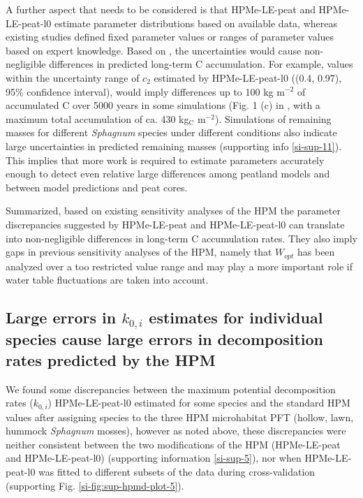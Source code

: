 \documentclass[esd, manuscript]{copernicus}
\begin{document}
A further aspect that needs to be considered is that HPMe-LE-peat and HPMe-LE-peat-l0 estimate parameter distributions based on available data, whereas existing studies defined fixed parameter values or ranges of parameter values based on expert knowledge. Based on \citet{Quillet.2013}, the uncertainties would cause non-negligible differences in predicted long-term C accumulation. For example, values within the uncertainty range of \(c_2\) estimated by HPMe-LE-peat-l0 ((0.4, 0.97), 95\% confidence interval), would imply differences up to 100 kg m\(^{-2}\) of accumulated C over 5000 years in some simulations (Fig. 1 (c) in \citet{Quillet.2013}, with a maximum total accumulation of ca. 430 kg\(_\text{C}\) m\(^{-2}\)). Simulations of remaining masses for different \emph{Sphagnum} species under different conditions also indicate large uncertainties in predicted remaining masses (supporting info \ref{si-sup-11}). This implies that more work is required to estimate parameters accurately enough to detect even relative large differences among peatland models and between model predictions and peat cores.

Summarized, based on existing sensitivity analyses of the HPM the parameter discrepancies suggested by HPMe-LE-peat and HPMe-LE-peat-l0 can translate into non-negligible differences in long-term C accumulation rates. They also imply gaps in previous sensitivity analyses of the HPM, namely that \(W_{opt}\) has been analyzed over a too restricted value range and may play a more important role if water table fluctuations are taken into account.

\hypertarget{out-discussion-7}{%
\subsection{\texorpdfstring{Large errors in \(k_{0,i}\) estimates for individual species cause large errors in decomposition rates predicted by the HPM}{Large errors in k\_\{0,i\} estimates for individual species cause large errors in decomposition rates predicted by the HPM}}\label{out-discussion-7}}

We found some discrepancies between the maximum potential decomposition rates (\(k_{0,i}\)) HPMe-LE-peat-l0 estimated for some species and the standard HPM values after assigning species to the three HPM microhabitat PFT (hollow, lawn, hummock \emph{Sphagnum} mosses), however as noted above, these discrepancies were neither consistent between the two modifications of the HPM (HPMe-LE-peat and HPMe-LE-peat-l0) (supporting information \ref{si-sup-5}), nor when HPMe-LE-peat-l0 was fitted to different subsets of the data during cross-validation (supporting Fig. \ref{si-fig:sup-hpmd-plot-5}).
\end{document}
